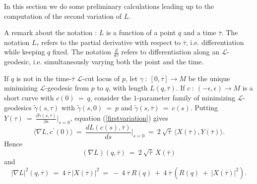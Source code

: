 \documentclass[12pt]{amsart}
\numberwithin{equation}{section}
\theoremstyle{plain}
\theoremstyle{definition}
\theoremstyle{remark}
\begin{document}
In this section we do some preliminary calculations leading up to the
computation of the second variation of $L$.

A remark about the notation : $L$ is a function of
a point $q$ and a time $\overline{\tau}$. The notation
$L_{\overline{\tau}}$ refers to the partial derivative with
respect to $\overline{\tau}$, i.e. differentiation while keeping
$q$ fixed.  The notation $\frac{d}{d\tau}$ refers to differentiation
along an ${\mathcal L}$-geodesic, i.e. simultaneously
varying both the point and the time.

If $q$ is not in the time-$\overline{\tau}$ 
${\mathcal L}$-cut locus of $p$, let
$\gamma \: : \: [0, \overline{\tau}] \rightarrow M$ be the unique minimizing
${\mathcal L}$-geodesic from $p$ to $q$, with length $L(q, \overline{\tau})$.
If $c \: : \: (- \epsilon, \epsilon) \rightarrow M$ is a short curve
with $c(0) \: = \: q$, consider the $1$-parameter
family of minimizing ${\mathcal L}$-geodesics
$\tilde\gamma(s, \tau)$ 
with $\tilde\gamma(s, 0) \: = \: p$ and $\tilde\gamma(s, \overline{\tau})
\: =\: c(s)$. Putting $Y(\tau) \: =\: 
\frac{\partial \tilde\gamma(s, \tau)}{\partial s} \Big|_{s=0}$,
equation (\ref{firstvariation}) gives
\begin{equation} 
\langle \nabla L, c^\prime(0) \rangle \: = \: 
\frac{dL(c(s), \overline{\tau})}{ds} \Big|_{s=0} \: = \:
2 \: \sqrt{\overline{\tau}} \:
\langle X(\overline{\tau}), Y(\overline{\tau}) \rangle. 
\end{equation}
Hence 
\begin{equation} \label{grad1}
(\nabla L)(q, \overline{\tau}) \: = \: 
2 \: \sqrt{\overline{\tau}} \: X(\overline{\tau})
\end{equation}
and
\begin{equation} \label{gradsq}
|\nabla L|^2(q, \overline{\tau}) \: = \: 
4 \: {\overline{\tau}} \: |X(\overline{\tau})|^2 \: = \:
- \: 4 \: {\overline{\tau}} \: R(q) \: + \:
4 \: {\overline{\tau}} \: \left( R(q) \: + \: |X(\overline{\tau})|^2 \right).
\end{equation}
\end{document}
